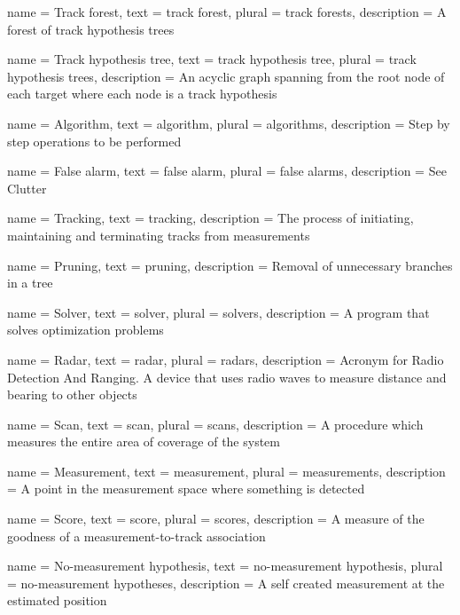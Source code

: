 {
	name 		= {Track forest},
	text 		= {track forest},
	plural 		= {track forests},
	description = {A forest of track hypothesis trees}
}

{
	name 		= {Track hypothesis tree},
	text 		= {track hypothesis tree},
	plural 		= {track hypothesis trees},
	description = {An acyclic graph spanning from the root node of each target where each node is a track hypothesis}
}

{
	name 		= Algorithm,
	text 		= algorithm,
	plural 		= algorithms,
	description = {Step by step operations to be performed}
}

{
	name 		= {False alarm},
	text 		= {false alarm},
	plural 		= {false alarms},
	description = {See Clutter}
}

{
	name 		= Tracking,
	text 		= tracking,
	description = {The process of initiating, maintaining and terminating tracks from measurements}
}

{
	name 		= Pruning,
	text 		= pruning,
	description = {Removal of unnecessary branches in a tree}
}

{
	name 		= Solver,
	text 		= solver,
	plural 		= solvers,
	description = {A program that solves optimization problems}
}

{
	name 		= Radar,
	text 		= radar,
	plural 		= radars,
	description = {Acronym for Radio Detection And Ranging. A device that uses radio waves to measure distance and bearing to other objects}
}

{
	name 		= Scan,
	text		= scan,
	plural 		= scans,
	description = {A procedure which measures the entire area of coverage of the system}
}

{
	name 		= Measurement,
	text 		= measurement,
	plural 		= measurements,
	description = {A point in the measurement space where something is detected}
}

{
	name 		= Score,
	text 		= score,
	plural		= scores,
	description = {A measure of the goodness of a measurement-to-track association}
}

{
	name 		= {No-measurement hypothesis},
	text 		= {no-measurement hypothesis},
	plural		= {no-measurement hypotheses},
	description = {A self created measurement at the estimated position}
}

